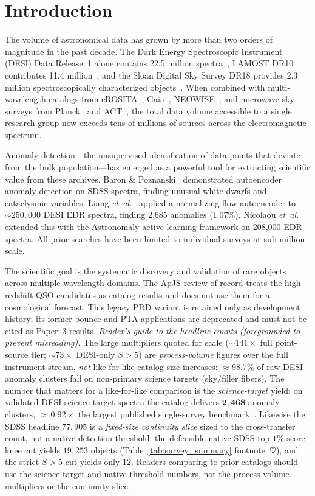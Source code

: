 \documentclass[aps,prd,twocolumn,superscriptaddress,showpacs,preprintnumbers,nofootinbib,longbibliography,floatfix]{revtex4-2}
\newcommand{\etal}{\textit{et~al.}}
\begin{document}
\section{Introduction}\label{sec:intro}

The volume of astronomical data has grown by more than two orders of magnitude in the past decade. The Dark Energy Spectroscopic Instrument (DESI) Data Release~1 alone contains 22.5 million spectra~\cite{DESI2025DR1}, LAMOST DR10 contributes 11.4 million~\cite{LAMOST_DR10}, and the Sloan Digital Sky Survey DR18 provides 2.3 million spectroscopically characterized objects~\cite{SDSS_DR18}. When combined with multi-wavelength catalogs from eROSITA~\cite{eROSITA_DR1}, Gaia~\cite{GaiaDR3}, NEOWISE~\cite{NEOWISE}, and microwave sky surveys from Planck~\cite{Planck2018} and ACT~\cite{ACT_DR6}, the total data volume accessible to a single research group now exceeds tens of millions of sources across the electromagnetic spectrum.

Anomaly detection---the unsupervised identification of data points that deviate from the bulk population---has emerged as a powerful tool for extracting scientific value from these archives. Baron \& Poznanski~\cite{Baron2017} demonstrated autoencoder anomaly detection on SDSS spectra, finding unusual white dwarfs and cataclysmic variables. Liang \etal~\cite{Liang2023} applied a normalizing-flow autoencoder to $\sim\!250{,}000$ DESI EDR spectra, finding 2{,}685 anomalies (1.07\%). Nicolaou \etal~\cite{Nicolaou2026} extended this with the Astronomaly active-learning framework on 208{,}000 EDR spectra. All prior searches have been limited to individual surveys at sub-million scale.

The scientific goal is the systematic discovery and validation of rare objects across multiple wavelength domains. The ApJS review-of-record treats the high-redshift QSO candidates as catalog results and does not use them for a cosmological forecast. This legacy PRD variant is retained only as development history; its former bounce and PTA applications are deprecated and must not be cited as Paper~3 results.
\emph{Reader's guide to the headline counts (foregrounded to prevent misreading).} The large multipliers quoted for scale ($\sim\!141\times$ full point-source tier; $\sim\!73\times$ DESI-only $S>5$) are \emph{process-volume} figures over the full instrument stream, \emph{not} like-for-like catalog-size increases: $\approx\!98.7\%$ of raw DESI anomaly clusters fall on non-primary science targets (sky/filler fibers). The number that matters for a like-for-like comparison is the \emph{science-target} yield: on validated DESI science-target spectra the catalog delivers $\mathbf{2{,}468}$ anomaly clusters, ${\approx}\,0.92\times$ the largest published single-survey benchmark~\cite{Liang2023}. Likewise the SDSS headline $77{,}905$ is a \emph{fixed-size continuity slice} sized to the cross-transfer count, not a native detection threshold: the defensible native SDSS top-$1\%$ score-knee cut yields $19{,}253$ objects (Table~\ref{tab:survey_summary} footnote~$\heartsuit$), and the strict $S>5$ cut yields only $12$. Readers comparing to prior catalogs should use the science-target and native-threshold numbers, not the process-volume multipliers or the continuity slice.
\end{document}
